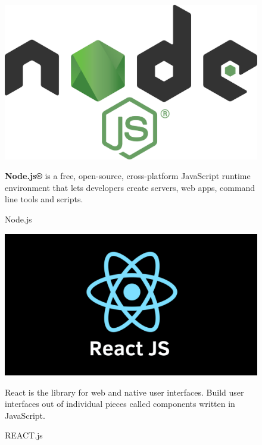 \begin{figure}[h]
\centering
\begin{minipage}{0.3\textwidth}
    \centering
    \includegraphics[width=\linewidth,frame]{figures/node.png}
    \caption{Node.js}
\end{minipage}
\hfill
\begin{minipage}{0.6\textwidth}
  \textbf{Node.js®} is a free, open-source, cross-platform JavaScript runtime environment that lets developers create servers, web apps, command line tools and scripts.\cite{samplewebs18}
\end{minipage}
\end{figure}

\begin{figure}[h]
\centering
\begin{minipage}{0.3\textwidth}
    \centering
    \includegraphics[width=\linewidth,frame]{figures/react.png}
    \caption{REACT.js}
\end{minipage}
\hfill
\begin{minipage}{0.6\textwidth}
  React is the library for web and native user interfaces. Build user interfaces out of individual pieces called components written in JavaScript.\cite{samplewebs16}
\end{minipage}
\end{figure}

